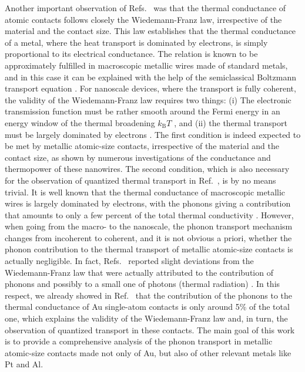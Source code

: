 \documentclass[aps,amsmath,amssymb,twocolumn,showpacs]{revtex4-1}
\begin{document}
Another important observation of Refs.~ was that
the thermal conductance of atomic contacts follows closely the Wiedemann-Franz
law, irrespective of the material and the contact size. This law establishes
that the thermal conductance of a metal, where the heat transport is dominated
by electrons, is simply proportional to its electrical conductance. The
relation is known to be approximately fulfilled in macroscopic metallic wires
made of standard metals, and in this case it can be explained with the help of
the semiclassical Boltzmann transport equation \cite{Ziman2001}. For nanoscale
devices, where the transport is fully coherent, the validity of the
Wiedemann-Franz law requires two things: (i) The electronic transmission
function must be rather smooth around the Fermi energy in an energy window of
the thermal broadening $k_{\text{B}}T$
\cite{Butcher1990,vanHouten1992,Cuevas2017}, and (ii) the thermal transport
must be largely dominated by electrons \cite{Note1}.  The first condition is
indeed expected to be met by metallic atomic-size contacts, irrespective of
the material and the contact size, as shown by numerous investigations of the
conductance \cite{Agrait2003} and thermopower \cite{Ludoph1999,Evangeli2015}
of these nanowires. The second condition, which is also necessary for the
observation of quantized thermal transport in Ref.~, is by
no means trivial. It is well known that the thermal conductance of macroscopic
metallic wires is largely dominated by electrons, with the phonons giving a
contribution that amounts to only a few percent of the total thermal
conductivity \cite{Jain2016}. However, when going from the macro- to the
nanoscale, the phonon transport mechanism changes from incoherent to coherent,
and it is not obvious a priori, whether the phonon contribution to the thermal
transport of metallic atomic-size contacts is actually negligible. In fact,
Refs.~ reported slight
deviations from the Wiedemann-Franz law that were actually attributed to the
contribution of phonons and possibly to a small one of photons (thermal
radiation) \cite{Cui2017}. In this respect, we already showed in
Ref.~ that the contribution of the phonons to the thermal
conductance of Au single-atom contacts is only around 5\% of the total one,
which explains the validity of the Wiedemann-Franz law and, in turn, the
observation of quantized transport in these contacts.  The main goal of this
work is to provide a comprehensive analysis of the phonon transport in
metallic atomic-size contacts made not only of Au, but also of other relevant
metals like Pt and Al.
\end{document}
